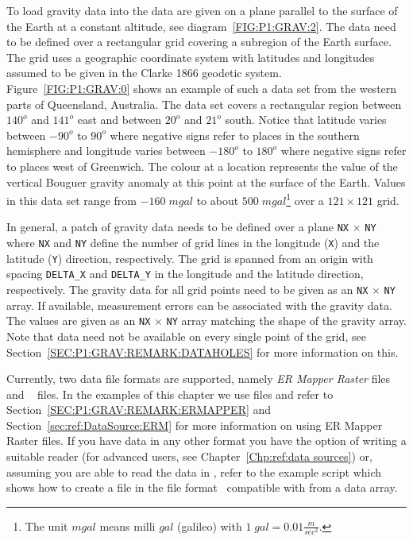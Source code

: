 To load gravity data into \downunder the data are given on a plane parallel
to the surface of the Earth at a constant altitude, see
diagram~\ref{FIG:P1:GRAV:2}.
The data need to be defined over a rectangular grid covering a subregion of
the Earth surface.
The grid uses a geographic coordinate system with latitudes and longitudes
assumed to be given in the Clarke 1866 geodetic system.
Figure~\ref{FIG:P1:GRAV:0} shows an example of such a data set from the
western parts of Queensland, Australia.
The data set covers a rectangular region between $140^o$ and $141^o$ east
and between $20^o$ and $21^o$ south.
Notice that latitude varies between $-90^o$ to $90^o$ where negative signs
refer to places in the southern hemisphere and longitude varies between
$-180^o$ to $180^o$ where negative signs refer to places west of Greenwich.
The colour at a location represents the value of the vertical Bouguer gravity
anomaly at this point at the surface of the Earth.
Values in this data set range from $-160 \; mgal$ to about $500 \; mgal$\footnote{The unit
$mgal$ means milli $gal$ (galileo) with $1 \; gal = 0.01 \frac{m}{sec^2}$.}
over a $121 \times 121$ grid.

In general, a patch of gravity data needs to be defined over a plane
\verb|NX| $\times$ \verb|NY| where \verb|NX| and \verb|NY| define the number
of grid lines in the longitude (\verb|X|) and the latitude (\verb|Y|)
direction, respectively.
The grid is spanned from an origin with spacing \verb|DELTA_X| and
\verb|DELTA_Y| in the longitude and the latitude direction, respectively.
The gravity data for all grid points need to be given as an \verb|NX|
$\times$ \verb|NY| array.
If available, measurement errors can be associated with the gravity data.
The values are given as an \verb|NX| $\times$ \verb|NY| array matching the
shape of the gravity array.
Note that data need not be available on every single point of the grid, see
Section~\ref{SEC:P1:GRAV:REMARK:DATAHOLES} for more information on this.

Currently, two data file formats are supported, namely \emph{ER Mapper Raster}
\cite{ERMAPPER} files and \netcdf~\cite{NETCDF} files.
In the examples of this chapter we use \netcdf files and refer to
Section~\ref{SEC:P1:GRAV:REMARK:ERMAPPER} and
Section~\ref{sec:ref:DataSource:ERM} for more information on using ER Mapper
Raster files.
If you have data in any other format you have the option of writing a suitable
reader (for advanced users, see Chapter~\ref{Chp:ref:data sources}) or,
assuming you are able to read the data in \Python, refer to the example
script  which shows how to create a file
in the \netcdf file format~\cite{NETCDF} compatible with \downunder from
a data array.

